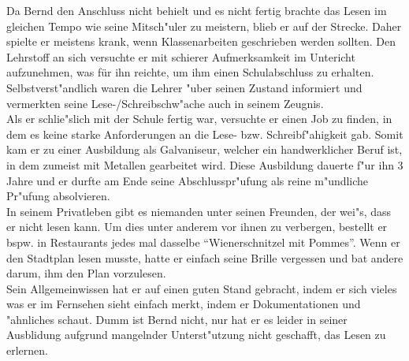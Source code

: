 Da Bernd den Anschluss nicht behielt und es nicht fertig brachte das Lesen im gleichen Tempo wie seine Mitsch"uler zu meistern, blieb er auf der Strecke. Daher spielte er meistens krank, wenn Klassenarbeiten geschrieben werden sollten. Den Lehrstoff an sich versuchte er mit schierer Aufmerksamkeit im Untericht aufzunehmen, was für ihn reichte, um ihm einen Schulabschluss zu erhalten. Selbstverst"andlich waren die Lehrer "uber seinen Zustand informiert und vermerkten seine Lese-/Schreibschw"ache auch in seinem Zeugnis.\\

 Als er schlie"slich mit der Schule fertig war, versuchte er einen Job zu finden, in dem es keine starke Anforderungen an die Lese- bzw. Schreibf"ahigkeit gab. Somit kam er zu einer Ausbildung als Galvaniseur, welcher ein handwerklicher Beruf ist, in dem zumeist mit Metallen gearbeitet wird. Diese Ausbildung dauerte f"ur ihn 3 Jahre und er durfte am Ende seine Abschlusspr"ufung als reine m"undliche Pr"ufung absolvieren.\\

In seinem Privatleben gibt es niemanden unter seinen Freunden, der wei"s, dass er nicht lesen kann. Um dies unter anderem vor ihnen zu verbergen, bestellt er bspw. in Restaurants jedes mal dasselbe "`Wienerschnitzel mit Pommes"'. Wenn er den Stadtplan lesen musste, hatte er einfach seine Brille vergessen und bat andere darum, ihm den Plan vorzulesen.\\

Sein Allgemeinwissen hat er auf einen guten Stand gebracht, indem er sich vieles was er im Fernsehen sieht einfach merkt, indem er Dokumentationen und "ahnliches schaut. Dumm ist Bernd nicht, nur hat er es leider in seiner Ausblidung aufgrund mangelnder Unterst"utzung nicht geschafft, das Lesen zu erlernen.

